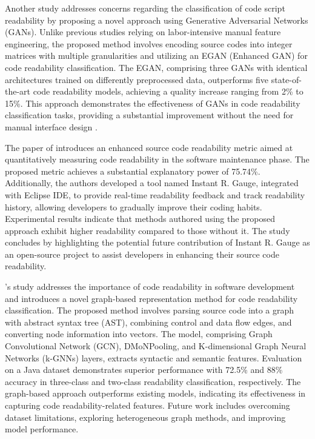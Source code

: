 \documentclass[%
class=scrreprt,
chapterprefix=false,%
open=right,%
twoside=false,%
paper=a4,%
logofile={Logo\_zentral\_farbig\_EN.png},%
thesistype=master,%
UKenglish,%
]{se2thesis}
\begin{document}
	Another study addresses concerns regarding the classification of code script readability by proposing a novel approach using Generative Adversarial Networks (GANs). Unlike previous studies relying on labor-intensive manual feature engineering, the proposed method involves encoding source codes into integer matrices with multiple granularities and utilizing an EGAN (Enhanced GAN) for code readability classification. The EGAN, comprising three GANs with identical architectures trained on differently preprocessed data, outperforms five state-of-the-art code readability models, achieving a quality increase ranging from 2\% to 15\%. This approach demonstrates the effectiveness of GANs in code readability classification tasks, providing a substantial improvement without the need for manual interface design \cite{sharma2020egan}.
	
	The paper of \citeauthor{choi2020metric} introduces an enhanced source code readability metric aimed at quantitatively measuring code readability in the software maintenance phase. The proposed metric achieves a substantial explanatory power of 75.74\%. Additionally, the authors developed a tool named Instant R. Gauge, integrated with Eclipse IDE, to provide real-time readability feedback and track readability history, allowing developers to gradually improve their coding habits. Experimental results indicate that methods authored using the proposed approach exhibit higher readability compared to those without it. The study concludes by highlighting the potential future contribution of Instant R. Gauge as an open-source project to assist developers in enhancing their source code readability.
	
	\citeauthor{mi2023graph}'s study addresses the importance of code readability in software development and introduces a novel graph-based representation method for code readability classification. The proposed method involves parsing source code into a graph with abstract syntax tree (AST), combining control and data flow edges, and converting node information into vectors. The model, comprising Graph Convolutional Network (GCN), DMoNPooling, and K-dimensional Graph Neural Networks (k-GNNs) layers, extracts syntactic and semantic features. Evaluation on a Java dataset demonstrates superior performance with 72.5\% and 88\% accuracy in three-class and two-class readability classification, respectively. The graph-based approach outperforms existing models, indicating its effectiveness in capturing code readability-related features. Future work includes overcoming dataset limitations, exploring heterogeneous graph methods, and improving model performance. 
	
\end{document}
